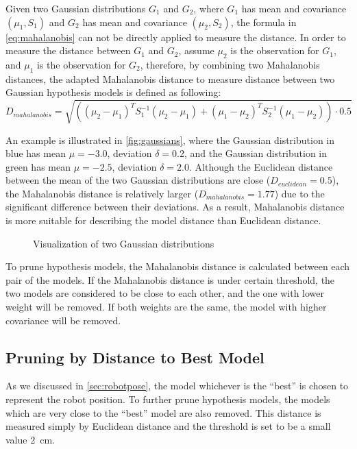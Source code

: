 Given two Gaussian distributions $G_1$ and $G_2$, where $G_1$ has mean and covariance $(\mu_1,S_1)$ and $G_2$ has mean and covariance $(\mu_2,S_2)$, the formula in \autoref{eq:mahalanobis} can not be directly applied to measure the distance.
In order to measure the distance between $G_1$ and $G_2$, assume $\mu_2$ is the observation for $G_1$, and $\mu_1$ is the observation for $G_2$, therefore, by combining two Mahalanobis distances,
the adapted Mahalanobis distance to measure distance between two Gaussian hypothesis models is defined as following:
\begin{equation}
\label{eq:mahalanobismod}
D_{mahalanobis} = \sqrt{((\mu_2 - \mu_1)^T S_1^{-1} (\mu_2-\mu_1) + (\mu_1 - \mu_2)^T S_2^{-1} (\mu_1-\mu_2)) \cdot 0.5}
\end{equation}

An example is illustrated in \autoref{fig:gaussians}, where the Gaussian distribution in blue has mean $\mu=-3.0$, deviation $\delta=0.2$, and the Gaussian distribution in green has mean $\mu=-2.5$, deviation $\delta=2.0$. Although the Euclidean distance between the mean of the two Gaussian distributions are close ($D_{euclidean}=0.5$), the Mahalanobis distance is relatively larger ($D_{mahalanobis}=1.77$) due to the significant difference between their deviations. As a result, Mahalanobis distance is more suitable for describing the model distance than Euclidean distance.


\begin{figure}[!htbp]
\begin{center}
  
\end{center}
\caption{Visualization of two Gaussian distributions}
\label{fig:gaussians}
\end{figure}


To prune hypothesis models, the Mahalanobis distance is calculated between each pair of the models. If the Mahalanobis distance is under certain threshold, the two models are considered to be close to each other, and the one with lower weight will be removed. If both weights are the same, the model with higher covariance will be removed.


\subsection{Pruning by Distance to Best Model}
\label{sub:Pruning by Distance to Best Model}

As we discussed in \autoref{sec:robotpose}, the model whichever is the ``best'' is chosen to represent the robot position. To further prune hypothesis models, the models which are very close to the ``best'' model are also removed. This distance is measured simply by Euclidean distance and the threshold is set to be a small value \SI{2}{\cm}.

